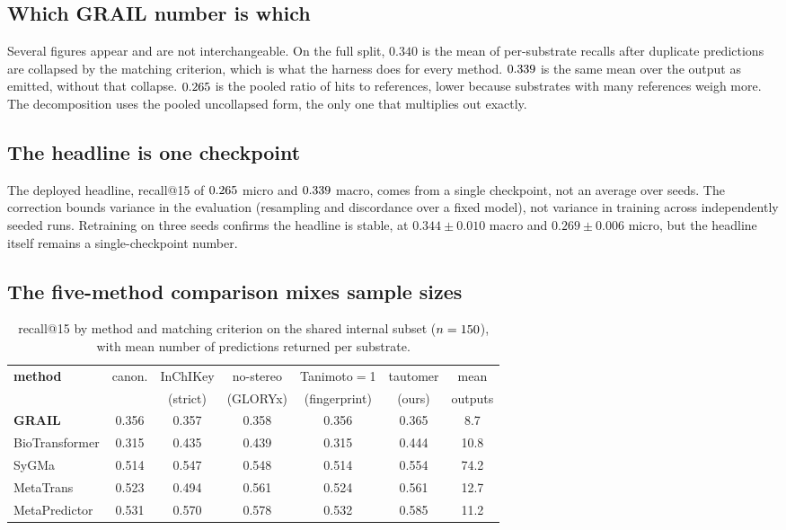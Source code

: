 \subsection{Which GRAIL number is which}

Several figures appear and are not interchangeable. On the full split, $0.340$ is the mean of per-substrate recalls after duplicate predictions are
collapsed by the matching criterion, which is what the harness does for every method. $0.339$
is the same mean over the output as emitted, without that collapse. $0.265$ is the pooled ratio
of hits to references, lower because substrates with many references weigh more. The decomposition uses the pooled uncollapsed form, the only one that multiplies out
exactly.

\subsection{The headline is one checkpoint}
\label{app:headline}

The deployed headline, recall@15 of $0.265$ micro and $0.339$ macro, comes from a single
checkpoint, not an average over seeds. The correction bounds variance in the evaluation
(resampling and discordance over a fixed model), not variance in training across independently
seeded runs. Retraining on three seeds confirms the headline is stable, at $0.344\pm0.010$ macro
and $0.269\pm0.006$ micro, but the headline itself remains a single-checkpoint number.

\subsection{The five-method comparison mixes sample sizes}

\begin{table}[h]
\caption{recall@15 by method and matching criterion on the shared internal subset
($n=150$), with mean number of predictions returned per substrate.}
\label{tab:matchsens-subset}
\begin{center}
\begin{tabular}{lccccc c}
\toprule
\textbf{method} & canon. & InChIKey & no-stereo & Tanimoto$=$1 & tautomer & mean \\
 & & (strict) & (GLORYx) & (fingerprint) & (ours) & outputs \\
\midrule
\textbf{GRAIL}   & 0.356 & 0.357 & 0.358 & 0.356 & 0.365 & \phantom{0}8.7 \\
BioTransformer   & 0.315 & 0.435 & 0.439 & 0.315 & 0.444 & 10.8 \\
SyGMa            & 0.514 & 0.547 & 0.548 & 0.514 & 0.554 & 74.2 \\
MetaTrans        & 0.523 & 0.494 & 0.561 & 0.524 & 0.561 & 12.7 \\
MetaPredictor    & 0.531 & 0.570 & 0.578 & 0.532 & 0.585 & 11.2 \\
\bottomrule
\end{tabular}
\end{center}
\end{table}


